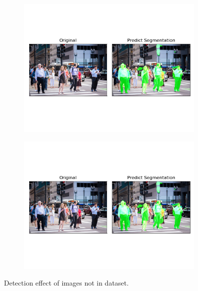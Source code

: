 \documentclass[10pt, a4paper]{article}
\begin{document}
\begin{multicols}{2}
	\lipsum[1-3]
	\begin{figure}[htb] %
	  \centering
	  \begin{subfigure}[b]{0.45\linewidth}
	    \includegraphics[width=\linewidth]{predict1.png}
	  \end{subfigure}
	  \begin{subfigure}[b]{0.45\linewidth}
	    \includegraphics[width=\linewidth]{predict1.png}
	  \end{subfigure}
	  \caption{Detection effect of images not in dataset.}
	  \label{fig:result2}
	\end{figure}
	\lipsum[4]


\end{multicols}
\end{document}
